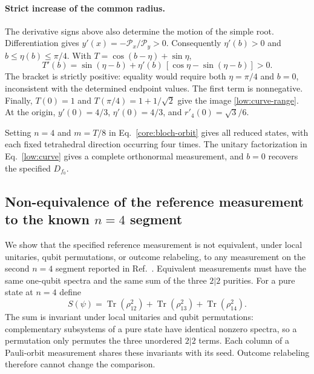 \paragraph{Strict increase of the common radius.}
The derivative signs above also determine the motion of the simple root. Differentiation gives
$y'(x)=-\mathcal P_x/\mathcal P_y>0$.  Consequently $\eta'(b)>0$ and
$b\le \eta(b)\le\pi/4$.  With $T=\cos(b-\eta)+\sin \eta$,
\begin{equation}
 T'(b)=\sin(\eta-b)+\eta'(b)\,[\cos \eta-\sin(\eta-b)]>0.
 \label{low:monotone}
\end{equation}
The bracket is strictly positive: equality would require both
$\eta=\pi/4$ and $b=0$, inconsistent with the determined endpoint values.
The first term is nonnegative.  Finally,
$T(0)=1$ and $T(\pi/4)=1+1/\sqrt2$ give the image
\eqref{low:curve-range}.  At the origin,
$y'(0)=4/3$, $\eta'(0)=4/3$, and $r'_4(0)=\sqrt3/6$.

Setting $n=4$ and $m=T/8$ in Eq.~\eqref{core:bloch-orbit} gives all
reduced states, with each fixed tetrahedral direction occurring four times.
The unitary factorization in Eq.~\eqref{low:curve} gives a complete
orthonormal measurement, and $b=0$ recovers the specified $D_{f_0}$.

\subsection{Non-equivalence of the reference measurement to the known \texorpdfstring{$n=4$}{n=4} segment}
\label{low:app-invariant}

We show that the specified reference measurement is not equivalent, under local unitaries, qubit permutations, or outcome relabeling, to any measurement on the second $n=4$ segment reported in Ref.~\cite{PauwelsGisin2026}.
Equivalent measurements must have the same one-qubit spectra and the same sum of the three $2|2$ purities. For a pure state at $n=4$ define
\begin{equation}
 S(\psi)=\operatorname{Tr}(\rho_{12}^{2})
 +\operatorname{Tr}(\rho_{13}^{2})
 +\operatorname{Tr}(\rho_{14}^{2}).
 \label{low:purity-invariant}
\end{equation}
The sum is invariant under local unitaries and qubit permutations:
complementary subsystems of a pure state have identical nonzero spectra,
so a permutation only permutes the three unordered $2|2$ terms.
Each column of a Pauli-orbit measurement shares these invariants with
its seed.  Outcome relabeling therefore cannot change the comparison.

